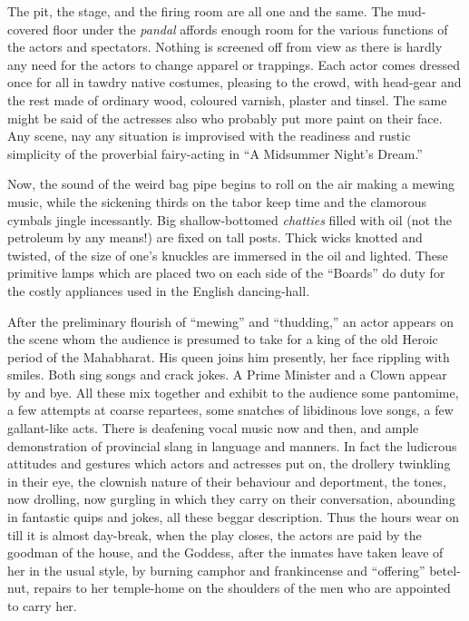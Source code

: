 \documentclass[a4paper, 12pt, oneside, english, twocolumn]{article}
\begin{document}
The pit, the stage, and the firing room are all one and the same. The mud-covered floor under the \emph{pandal} affords enough room for the various functions of the actors and spectators. Nothing is screened off from view as there is hardly any need for the actors to change apparel or trappings. Each actor comes dressed once for all in tawdry native costumes, pleasing to the crowd, with head-gear and the rest made of ordinary wood, coloured varnish, plaster and tinsel. The same might be said of the actresses also who probably put more paint on their face. Any scene, nay any situation is improvised with the readiness and rustic simplicity of the proverbial fairy-acting in ``A Midsummer Night's Dream.''

Now, the sound of the weird bag pipe begins to roll on the air making a mewing music, while the sickening thirds on the tabor keep time and the clamorous cymbals jingle incessantly. Big shallow-bottomed \emph{chatties} filled with oil (not the petroleum by any means!) are fixed on tall posts. Thick wicks knotted and twisted, of the size of one's knuckles are immersed in the oil and lighted. These primitive lamps which are placed two on each side of the ``Boards'' do duty for the costly appliances used in the English dancing-hall.

After the preliminary flourish of ``mewing'' and ``thudding,'' an actor appears on the scene whom the audience is presumed to take for a king of the old Heroic period of the Mahabharat. His queen joins him presently, her face rippling with smiles. Both sing songs and crack jokes. A Prime Minister and a Clown appear by and bye. All these mix together and exhibit to the audience some pantomime, a few attempts at coarse repartees, some snatches of libidinous love songs, a few gallant-like acts. There is deafening vocal music now and then, and ample demonstration of provincial slang in language and manners. In fact the ludicrous attitudes and gestures which actors and actresses put on, the drollery twinkling in their eye, the clownish nature of their behaviour and deportment, the tones, now drolling, now gurgling in which they carry on their conversation, abounding in fantastic quips and jokes, all these beggar description. Thus the hours wear on till it is almost day-break, when the play closes, the actors are paid by the goodman of the house, and the Goddess, after the inmates have taken leave of her in the usual style, by burning camphor and frankincense and ``offering'' betel-nut, repairs to her temple-home on the shoulders of the men who are appointed to carry her.
\end{document}
